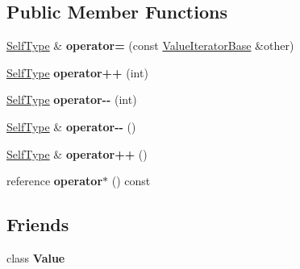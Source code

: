 \subsection*{Public Member Functions}
\begin{DoxyCompactItemize}
\item 
\hypertarget{class_json_1_1_value_const_iterator_ade307721f874f4474d1565753ce76523}{\hyperlink{class_json_1_1_value_iterator_base}{Self\-Type} \& {\bfseries operator=} (const \hyperlink{class_json_1_1_value_iterator_base}{Value\-Iterator\-Base} \&other)}\label{class_json_1_1_value_const_iterator_ade307721f874f4474d1565753ce76523}

\item 
\hypertarget{class_json_1_1_value_const_iterator_ab3f0c2edbfc8f7d60645f3d597d05e28}{\hyperlink{class_json_1_1_value_iterator_base}{Self\-Type} {\bfseries operator++} (int)}\label{class_json_1_1_value_const_iterator_ab3f0c2edbfc8f7d60645f3d597d05e28}

\item 
\hypertarget{class_json_1_1_value_const_iterator_a94935961e9331c6f7b907b05ec8df75e}{\hyperlink{class_json_1_1_value_iterator_base}{Self\-Type} {\bfseries operator-\/-\/} (int)}\label{class_json_1_1_value_const_iterator_a94935961e9331c6f7b907b05ec8df75e}

\item 
\hypertarget{class_json_1_1_value_const_iterator_a31415e44e44e56fb2bfda7e8bb784646}{\hyperlink{class_json_1_1_value_iterator_base}{Self\-Type} \& {\bfseries operator-\/-\/} ()}\label{class_json_1_1_value_const_iterator_a31415e44e44e56fb2bfda7e8bb784646}

\item 
\hypertarget{class_json_1_1_value_const_iterator_a2cfe2f7a94a688186efdafb1b181c319}{\hyperlink{class_json_1_1_value_iterator_base}{Self\-Type} \& {\bfseries operator++} ()}\label{class_json_1_1_value_const_iterator_a2cfe2f7a94a688186efdafb1b181c319}

\item 
\hypertarget{class_json_1_1_value_const_iterator_aeb44153d71c61ac9397a84d5ecc244c5}{reference {\bfseries operator$\ast$} () const }\label{class_json_1_1_value_const_iterator_aeb44153d71c61ac9397a84d5ecc244c5}

\end{DoxyCompactItemize}
\subsection*{Friends}
\begin{DoxyCompactItemize}
\item 
\hypertarget{class_json_1_1_value_const_iterator_aeceedf6e1a7d48a588516ce2b1983d6f}{class {\bfseries Value}}\label{class_json_1_1_value_const_iterator_aeceedf6e1a7d48a588516ce2b1983d6f}

\end{DoxyCompactItemize}


